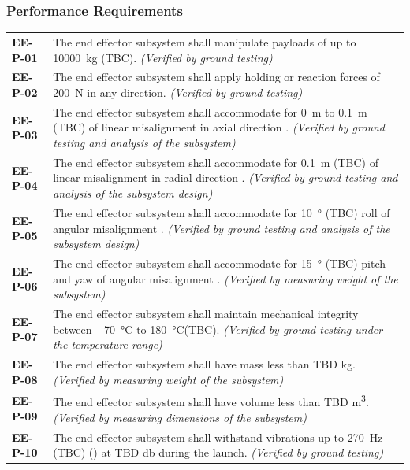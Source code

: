 \documentclass[12pt, letterpaper]{article}
\begin{document}
\subsubsection*{Performance Requirements}
\vspace{-20pt}
\begin{longtable}{P{2cm}P{13.75cm}}
\textbf{EE-P-01}	&
The end effector subsystem shall manipulate payloads of up to \SI{10000}{\kilo\gram} (TBC).
\textit{(Verified by ground testing)}	\\
\textbf{EE-P-02}	&
The end effector subsystem shall apply holding or reaction forces of \SI{200}{\newton} in any direction.
\textit{(Verified by ground testing)}	\\
\textbf{EE-P-03}	&
The end effector subsystem shall accommodate for \SI{0}{\metre} to \SI{0.1}{\metre} (TBC) of linear misalignment in axial direction \cite{NASAsysreq_Kumar}. 
\textit{(Verified by ground testing and analysis of the subsystem)}	\\
\textbf{EE-P-04}	&
The end effector subsystem shall accommodate for \SI{0.1}{\metre} (TBC) of linear misalignment in radial direction \cite{NASAsysreq_Kumar}. 
\textit{(Verified by ground testing and analysis of the subsystem design)}\\
\textbf{EE-P-05}	&
The end effector subsystem shall accommodate for \SI{10}{\degree} (TBC) roll of angular misalignment \cite{NASAsysreq_Kumar}.
\textit{(Verified by ground testing and analysis of the subsystem design)}\\
\textbf{EE-P-06}	&
The end effector subsystem shall accommodate for \SI{15}{\degree} (TBC) pitch and yaw of angular misalignment \cite{NASAsysreq_Kumar}.
\textit{(Verified by measuring weight of the subsystem)}	\\
\textbf{EE-P-07}	&
The end effector subsystem shall maintain mechanical integrity between \SI{-70}{\degreeCelsius} to \SI{180}{\degreeCelsius}(TBC).
\textit{(Verified by ground testing under the temperature range)}	\\
\textbf{EE-P-08}	&
The end effector subsystem shall have mass less than TBD \si{\kilo\gram}. \textit{(Verified by measuring weight of the subsystem)}	\\
\textbf{EE-P-09}	&
The end effector subsystem shall have volume less than TBD \si{\metre\cubed}.
\textit{(Verified by measuring dimensions of the subsystem)}	\\
\textbf{EE-P-10}	&
The end effector subsystem shall withstand vibrations up to \SI{270}{\hertz} (TBC) () at TBD \si{\decibel} during the launch.
\textit{(Verified by ground testing)}
\end{longtable}
\end{document}
